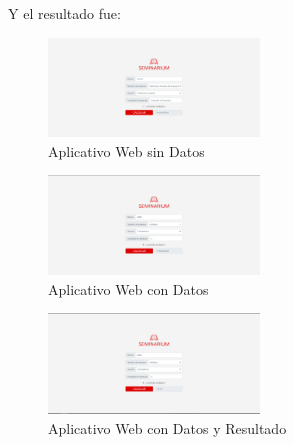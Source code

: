 \documentclass[conference]{IEEEtran}
\begin{document}
Y el resultado fue:
\begin{figure}[H]
    \centering
    \includegraphics[width=0.5\textwidth]{aplicativo/sin_datos}
    \caption{Aplicativo Web sin Datos}
    \label{fig:aplicativo_sin_datos}
\end{figure}
\begin{figure}[H]
    \centering
    \includegraphics[width=0.5\textwidth]{aplicativo/con_datos}
    \caption{Aplicativo Web con Datos}
    \label{fig:aplicativo_con_datos}
\end{figure}
\begin{figure}[H]
    \centering
    \includegraphics[width=0.5\textwidth]{aplicativo/con_datos_resultado}
    \caption{Aplicativo Web con Datos y Resultado}
    \label{fig:aplicativo_con_datos_resultado}
\end{figure}
\end{document}
